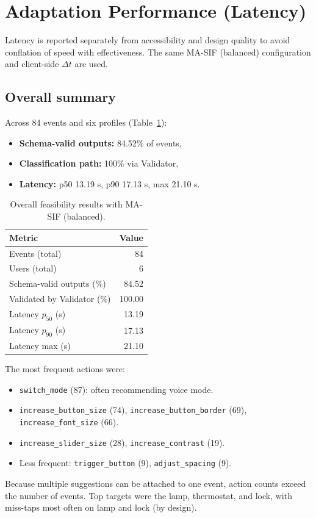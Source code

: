 \documentclass[openany]{book}
\begin{document}
\newpage
\section{Adaptation Performance (Latency)}
\label{sec:latency}
Latency is reported separately from accessibility and design quality to avoid conflation of speed with effectiveness. The same MA-SIF (balanced) configuration and client-side $\Delta t$ are used.

\subsection{Overall summary}
Across 84 events and six profiles (Table~\ref{tab:overall-feasibility}):
\begin{itemize}
  \item \textbf{Schema-valid outputs:} 84.52\% of events,
  \item \textbf{Classification path:} 100\% via Validator,
  \item \textbf{Latency:} p50 13.19 s, p90 17.13 s, max 21.10 s.
\end{itemize}

\begin{table}[H]
\centering
\caption{Overall feasibility results with MA-SIF (balanced).}
\label{tab:overall-feasibility}
\begin{tabular}{lr}
\toprule
\textbf{Metric} & \textbf{Value} \\
\midrule
Events (total) & 84 \\
Users (total) & 6 \\
Schema-valid outputs (\%) & 84.52 \\
Validated by Validator (\%) & 100.00 \\
Latency $p_{50}$ (s) & 13.19 \\
Latency $p_{90}$ (s) & 17.13 \\
Latency max (s) & 21.10 \\
\bottomrule
\end{tabular}
\end{table}

The most frequent actions were:
\begin{itemize}
    \item \texttt{switch\_mode} (87): often recommending voice mode.
    \item \texttt{increase\_button\_size} (74), \texttt{increase\_button\_border} (69), \texttt{increase\_font\_size} (66).
    \item \texttt{increase\_slider\_size} (28), \texttt{increase\_contrast} (19).
    \item Less frequent: \texttt{trigger\_button} (9), \texttt{adjust\_spacing} (9).
\end{itemize}
Because multiple suggestions can be attached to one event, action counts exceed the number of events. Top targets were the lamp, thermostat, and lock, with miss-taps most often on lamp and lock (by design).
\end{document}
